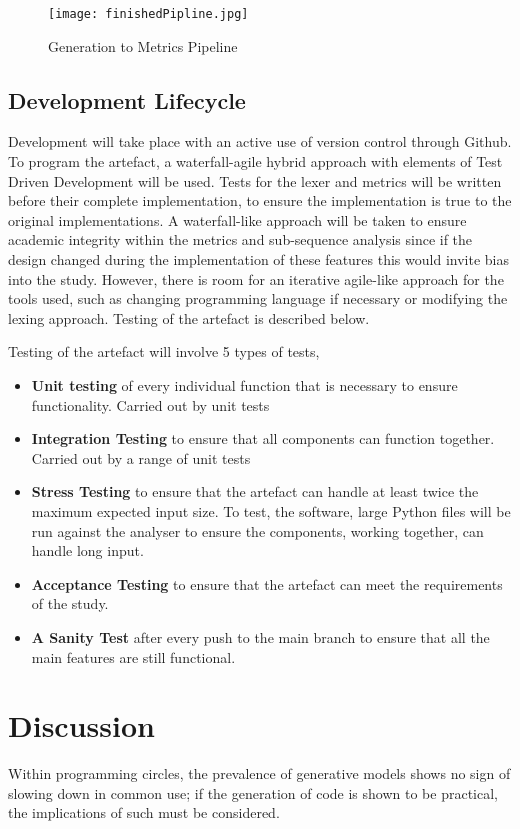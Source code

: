 \documentclass[manuscript,screen,review,sigconf]{acmart}
\begin{document}
\begin{figure}[h]
    \texttt{[image: finishedPipline.jpg]}
    \caption{Generation to Metrics Pipeline}
    \label{fig:CC Pipeline}
    \centering
\end{figure}

\subsection{Development Lifecycle}
Development will take place with an active use of version control through Github. To program the artefact, a waterfall-agile hybrid approach with elements of Test Driven Development will be used. Tests for the lexer and metrics will be written before their complete implementation, to ensure the implementation is true to the original implementations. A waterfall-like approach will be taken to ensure academic integrity within the metrics and sub-sequence analysis since if the design changed during the implementation of these features this would invite bias into the study. However, there is room for an iterative agile-like approach for the tools used, such as changing programming language if necessary or modifying the lexing approach.
Testing of the artefact is described below.

Testing of the artefact will involve 5 types of tests,
\begin{itemize}
    \item \textbf{Unit testing} of every individual function that is necessary to ensure functionality. Carried out by unit tests
    \item \textbf{Integration Testing} to ensure that all components can function together. Carried out by a range of unit tests
    \item \textbf{Stress Testing} to ensure that the artefact can handle at least twice the maximum expected input size. To test, the software, large Python files will be run against the analyser to ensure the components, working together, can handle long input.
    \item \textbf{Acceptance Testing} to ensure that the artefact can meet the requirements of the study.
    \item \textbf{A Sanity Test} after every push to the main branch to ensure that all the main features are still functional.
\end{itemize}


\section{Discussion}
Within programming circles, the prevalence of generative models shows no sign of slowing down in common use; if the generation of code is shown to be practical, the implications of such must be considered.
\end{document}
